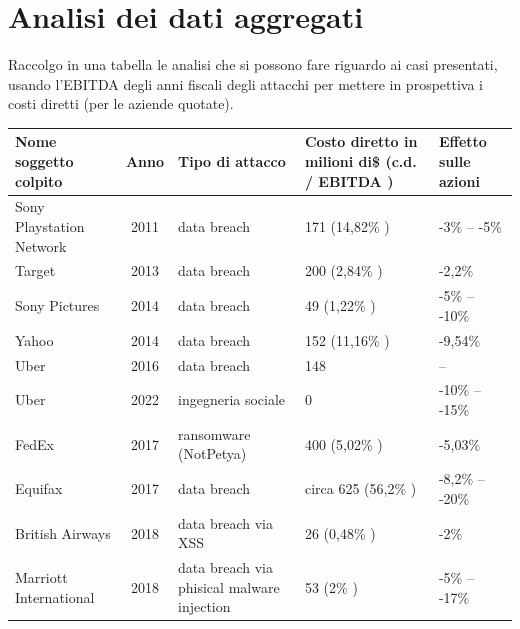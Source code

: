 \documentclass[12pt,a4paper,openright,twoside]{report}
\begin{document}
\clearpage{\pagestyle{empty}\cleardoublepage}



\chapter{Analisi dei dati aggregati}

Raccolgo in una tabella le analisi che si possono fare riguardo ai casi presentati, usando l'EBITDA degli anni fiscali degli attacchi per mettere in prospettiva i costi diretti (per le aziende quotate).


\begin{table}[H]
    \centering
    \begin{tabular}{|p{}|c|p{3cm}|p{}|p{}|}
        \hline
        \textbf{Nome soggetto colpito} & \textbf{Anno} & \textbf{Tipo di attacco} & \textbf{Costo diretto  in 
 milioni di\$ (c.d. / EBITDA )} & \textbf{Effetto sulle azioni}\\
        \hline
        Sony Playstation Network  & 2011 & data breach & 171  (14,82\% \cite{sony_q2_2012_20F}) & -3\% -- -5\% \\
        \hline
         Target & 2013 & data breach & 200  (2,84\% \cite{target_2013_10k}) & -2,2\% \\
         \hline
        Sony Pictures & 2014 & data breach & 49  (1,22\% \cite{SonyPic_20F_report}) & -5\% -- -10\% \\
         \hline
        Yahoo & 2014 & data breach & 152  (11,16\% \cite{yahoo_2014_10k}) & -9,54\% \\
         \hline
         Uber & 2016 & data breach & 148  & -- \\
         \hline
         Uber & 2022 & ingegneria sociale & 0 & -10\% -- -15\% \\
         \hline
         FedEx & 2017 & ransomware (NotPetya) & 400  (5,02\% \cite{FedEx_10K_report_2018}) & -5,03\% \\
         \hline
         Equifax & 2017 & data breach & circa 625  (56,2\% \cite{equifax_2017_10k}) & -8,2\% -- -20\% \\
         \hline
         British Airways & 2018 & data breach via XSS & 26  (0,48\% \cite{iag_2019_report}) & -2\% \\
         \hline
         Marriott International & 2018 & data breach via phisical malware injection & 53  (2\% \cite{marriott_2018_10k}) & -5\% -- -17\% \\

\end{tabular}
\end{table}
\end{document}
